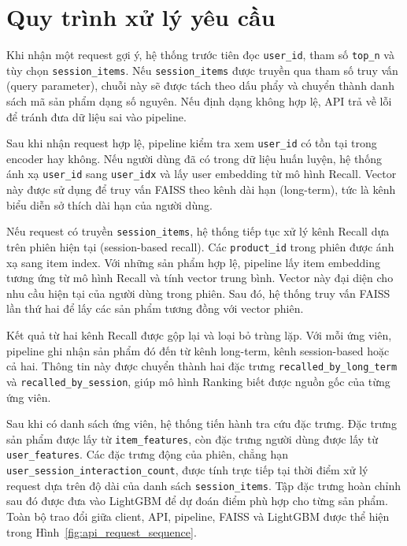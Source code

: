 \section{Quy trình xử lý yêu cầu}
Khi nhận một request gợi ý, hệ thống trước tiên đọc \texttt{user\_id}, tham số \texttt{top\_n} và tùy chọn \texttt{session\_items}. Nếu \texttt{session\_items} được truyền qua tham số truy vấn (query parameter), chuỗi này sẽ được tách theo dấu phẩy và chuyển thành danh sách mã sản phẩm dạng số nguyên. Nếu định dạng không hợp lệ, API trả về lỗi để tránh đưa dữ liệu sai vào pipeline.
\medskip

Sau khi nhận request hợp lệ, pipeline kiểm tra xem \texttt{user\_id} có tồn tại trong encoder hay không. Nếu người dùng đã có trong dữ liệu huấn luyện, hệ thống ánh xạ \texttt{user\_id} sang \texttt{user\_idx} và lấy user embedding từ mô hình Recall. Vector này được sử dụng để truy vấn FAISS theo kênh dài hạn (long-term), tức là kênh biểu diễn sở thích dài hạn của người dùng.
\medskip

Nếu request có truyền \texttt{session\_items}, hệ thống tiếp tục xử lý kênh Recall dựa trên phiên hiện tại (session-based recall). Các \texttt{product\_id} trong phiên được ánh xạ sang item index. Với những sản phẩm hợp lệ, pipeline lấy item embedding tương ứng từ mô hình Recall và tính vector trung bình. Vector này đại diện cho nhu cầu hiện tại của người dùng trong phiên. Sau đó, hệ thống truy vấn FAISS lần thứ hai để lấy các sản phẩm tương đồng với vector phiên.
\medskip

Kết quả từ hai kênh Recall được gộp lại và loại bỏ trùng lặp. Với mỗi ứng viên, pipeline ghi nhận sản phẩm đó đến từ kênh long-term, kênh session-based hoặc cả hai. Thông tin này được chuyển thành hai đặc trưng \texttt{recalled\_by\_long\_term} và \texttt{recalled\_by\_session}, giúp mô hình Ranking biết được nguồn gốc của từng ứng viên.
\medskip

Sau khi có danh sách ứng viên, hệ thống tiến hành tra cứu đặc trưng. Đặc trưng sản phẩm được lấy từ \texttt{item\_features}, còn đặc trưng người dùng được lấy từ \texttt{user\_features}. Các đặc trưng động của phiên, chẳng hạn \texttt{user\_session\_interaction\_count}, được tính trực tiếp tại thời điểm xử lý request dựa trên độ dài của danh sách \texttt{session\_items}. Tập đặc trưng hoàn chỉnh sau đó được đưa vào LightGBM để dự đoán điểm phù hợp cho từng sản phẩm. Toàn bộ trao đổi giữa client, API, pipeline, FAISS và LightGBM được thể hiện trong Hình~\ref{fig:api_request_sequence}.

